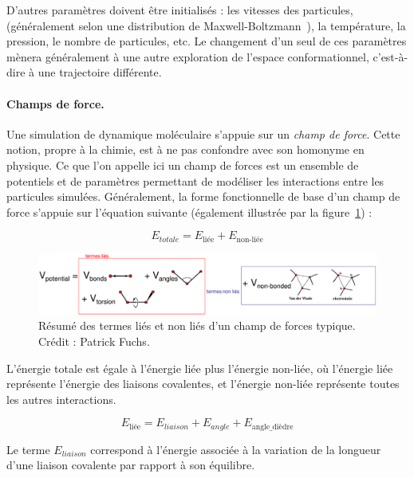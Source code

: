 	D'autres paramètres doivent être initialisés : les vitesses des particules, (généralement selon une distribution de Maxwell-Boltzmann~\cite{maxwell1860v, maxwell1860ii, boltzmann1970weitere, boltzmann2003further}), la température, la pression, le nombre de particules, etc. Le changement d'un seul de ces paramètres mènera généralement à une autre exploration de l'espace conformationnel, c'est-à-dire à une trajectoire différente.
	
	\paragraph{Champs de force.}
	Une simulation de dynamique moléculaire s'appuie sur un \emph{champ de force}. Cette notion, propre à la chimie, est à ne pas confondre avec son homonyme en physique. Ce que l'on appelle ici un champ de forces est un ensemble de potentiels et de paramètres permettant de modéliser les interactions entre les particules simulées. Généralement, la forme fonctionnelle de base d'un champ de force s'appuie sur l'équation suivante (également illustrée par la figure~\ref{fig:ffterms}) :
	
	\begin{equation}
		\label{eq:forcefield}
		E_{totale} = E_\text{liée} + E_\text{non-liée}
	\end{equation}
	
	\begin{figure}[htb]
		\centering
		\includegraphics[width=\textwidth]{figures/ch1/ffterms}
		\caption[Termes d'un champ de forces.]{Résumé des termes liés et non liés d'un champ de forces typique. Crédit : Patrick Fuchs\footnotemark.}
		\label{fig:ffterms}
	\end{figure}	
	
	L'énergie totale est égale à l'énergie liée plus l'énergie non-liée, où l'énergie liée représente l'énergie des liaisons covalentes, et l'énergie non-liée représente toutes les autres interactions.
	
	\begin{equation}
		\label{eq:ebonded}
		E_\text{liée} = E_{liaison} + E_{angle} + E_\text{angle\_{}dièdre}
	\end{equation}
	
	Le terme $E_{liaison}$ correspond à l'énergie associée à la variation de la longueur d'une liaison covalente par rapport à son équilibre.%
	
